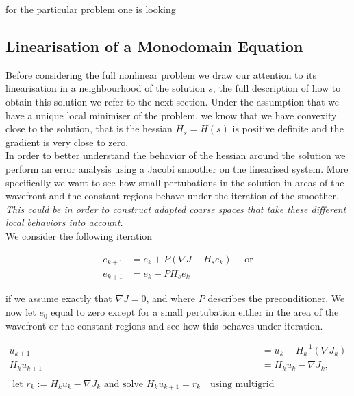 \documentclass[../draft_1.tex]{subfiles}
\begin{document}
 for the particular problem one is looking 

\subsection{Linearisation of a Monodomain Equation}

Before considering the full nonlinear problem we draw our attention to its linearisation in a neighbourhood of the solution $s$, the full description of how to obtain this solution we refer to the next section. Under the assumption that we have a unique local minimiser of the problem, we know that we have convexity close to the solution, that is the hessian $H_s = H(s)$ is positive definite and the gradient is very close to zero. \\
In order to better understand the behavior of the hessian around the solution we perform an error analysis using a Jacobi smoother on the linearised system. More specifically we want to see how small pertubations in the solution in areas of the wavefront and the constant regions behave under the iteration of the smoother. \textit{This could be in order to construct adapted coarse spaces that take these different local behaviors into account.} \\
We consider the following iteration 
\begin{ceqn}
	\begin{equation}
	\begin{aligned}
e_{k+1} &= e_k + P(\nabla J - H_s e_k) \quad \text{ or} \\
e_{k+1} &= e_k - P H_s e_k 
	\end{aligned}
	\end{equation}
\end{ceqn}
if we assume exactly that $\nabla J = 0$, and where $P$ describes the preconditioner. We now let $e_0$ equal to zero except for a small pertubation either in the area of the wavefront or the constant regions and see how this behaves under iteration.

\begin{ceqn}
	\begin{equation}
	\begin{aligned}
u_{k+1} &= u_k - H_k^{-1}(\nabla J_k) \\
H_k u_{k+1} &= H_k u_k - \nabla J_k, \\ 
\\
\text{ let } r_k := H_k u_k - \nabla J_k
\text{ and solve } H_k u_{k+1} = r_k \quad \text{using multigrid}
	\end{aligned}
	\end{equation}
\end{ceqn}
\end{document}
